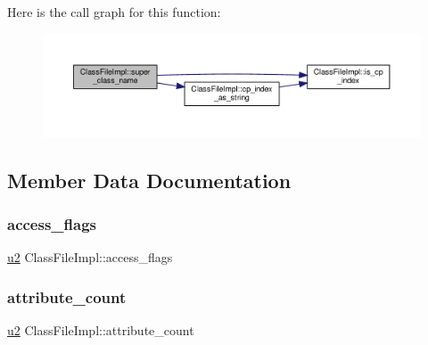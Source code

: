Here is the call graph for this function\+:
\nopagebreak
\begin{figure}[H]
\begin{center}
\leavevmode
\includegraphics[width=350pt]{classClassFileImpl_afd7229efcf341804086bcf6c00bb4820_cgraph}
\end{center}
\end{figure}


\subsection{Member Data Documentation}
\mbox{\label{classClassFileImpl_ae7bcc5b644d2164290c53a8727d36fb0}} 
\subsubsection{\texorpdfstring{access\+\_\+flags}{access\_flags}}
{\footnotesize\ttfamily \hyperlink{types_8h_ae676e9207f57fb921dca7366b2f59c53}{u2} Class\+File\+Impl\+::access\+\_\+flags}

\mbox{\label{classClassFileImpl_ac1085cebfdbb8a2469d9de9782d0576d}} 
\subsubsection{\texorpdfstring{attribute\+\_\+count}{attribute\_count}}
{\footnotesize\ttfamily \hyperlink{types_8h_ae676e9207f57fb921dca7366b2f59c53}{u2} Class\+File\+Impl\+::attribute\+\_\+count}

\mbox{\label{classClassFileImpl_a25689268cd6201a1b970a6dd41ac6fce}} 
